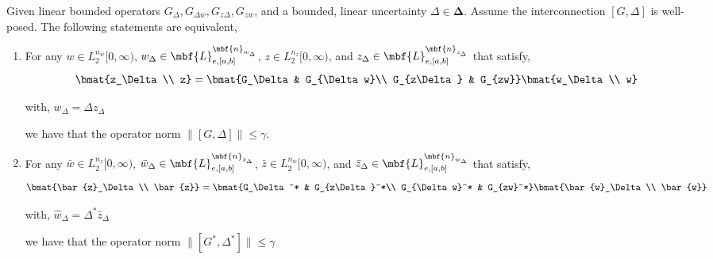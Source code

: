 \begin{lemma}\label{thm:duality}
Given linear bounded operators $G_\Delta, G_{\Delta w}, G_{z\Delta}, G_{zw}$,
and a bounded, linear uncertainty $\Delta \in \mathbf{\Delta}$. Assume the
interconnection $[G, \Delta]$ is well-posed. The following statements are
equivalent,
\begin{enumerate}
\item For any $w\in L_2^{n_w}[0,\infty)$,
$w_\Delta\in\mbf{L}_{e,[a,b]}^{\mbf{n}_{w_\Delta}}$, $z\in L_2^{n_z}[0,\infty)$,
and $z_\Delta \in \mbf{L}_{e,[a,b]}^{\mbf{n}_{z_\Delta}}$ that satisfy,
\begin{equation}\label{eqn:primal_system}
\bmat{z_\Delta\\ z}=\bmat{G_\Delta & G_{\Delta w}\\ G_{z\Delta} &
G_{zw}}\bmat{w_\Delta \\ w}
\end{equation}
\begin{center}
with, $w_\Delta = \Delta z_\Delta$
\end{center}
we have that the operator norm $\|[G,\Delta]\| \leq \gamma$.
\item For any $\bar{w}\in L_2^{n_z}[0,\infty)$,
$\bar{w}_\Delta\in\mbf{L}_{e,[a,b]}^{\mbf{n}_{z_\Delta}}$, $\bar{z}\in
L_2^{n_w}[0,\infty)$, and $\bar{z}_\Delta \in
\mbf{L}_{e,[a,b]}^{\mbf{n}_{w_\Delta}}$ that satisfy,
\begin{equation}\label{eqn:dual_system}
\bmat{\bar{z}_\Delta\\ \bar{z}}=\bmat{G_\Delta^* & G_{z\Delta}^*\\ G_{\Delta
w}^* & G_{zw}^*}\bmat{\bar{w}_\Delta \\ \bar{w}}
\end{equation}
\begin{center}
with, $\hat{w}_\Delta = \Delta^* \hat{z}_\Delta$
\end{center}
we have that the operator norm $\|[G^*,\Delta^*]\|\leq \gamma$
\end{enumerate}
\end{lemma}
